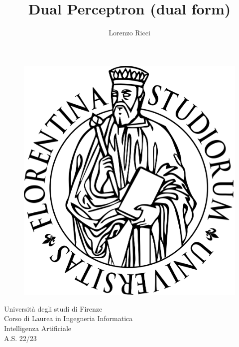 \documentclass{article}
\author{\large{Lorenzo Ricci}}
\title{\textbf{\fontsize{34pt}{45pt}\selectfont Dual Perceptron (dual form)}}
\date{}
\begin{document}
	\begin{figure}
		\centering
		\includegraphics[width=0.7\linewidth]{Unifi_nuovo.svg.png}
		\label{fig:unifinuovo}
	\end{figure}
	\maketitle
	\vspace*{2cm}
	\begin{center}
		\Large Università degli studi di Firenze\\ Corso di Laurea in Ingegneria Informatica\\ Intelligenza Artificiale\\ A.S. 22/23
	\end{center}
	\tableofcontents \newpage
\end{document}
